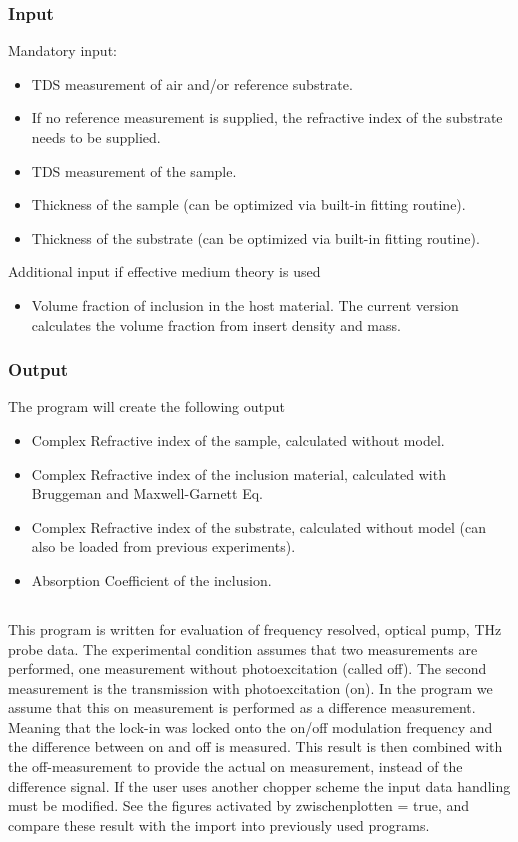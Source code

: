 \documentclass[12pt]{article}
\begin{document}
\subsubsection{Input}
Mandatory input:
\begin{itemize}
	\item TDS measurement of air and/or reference substrate.
	\item If no reference measurement is supplied, the refractive index of the substrate needs to be supplied.
	\item TDS measurement of the sample.
	\item Thickness of the sample (can be optimized via built-in fitting routine).
	\item Thickness of the substrate (can be optimized via built-in fitting routine).
\end{itemize}
Additional input if effective medium theory is used
\begin{itemize}
	\item Volume fraction of inclusion in the host material. The current version calculates the volume fraction from insert density and mass. 
\end{itemize}

\subsubsection{Output}
The program will create the following output
\begin{itemize}
\item Complex Refractive index of the sample, calculated without model.
\item Complex Refractive index of the inclusion material, calculated with Bruggeman and Maxwell-Garnett Eq. 
\item Complex Refractive index of the substrate, calculated without model (can also be loaded from previous experiments).
\item Absorption Coefficient of the inclusion.
\end{itemize}

\subsection{\TRTS}



This program is written for evaluation of frequency resolved, optical pump, THz probe data. The experimental condition assumes that two measurements are performed, one measurement without photoexcitation (called off). The second measurement is the transmission with photoexcitation (on). In the program we assume that this on measurement is performed as a difference measurement. Meaning that the lock-in was locked onto the on/off modulation frequency and the difference between on and off is measured. This result is then combined with the off-measurement to provide the actual on measurement, instead of the difference signal. 
If the user uses another chopper scheme the input data handling must be modified. See the figures activated by zwischenplotten = true, and compare these result with the import into previously used programs. 
\end{document}
